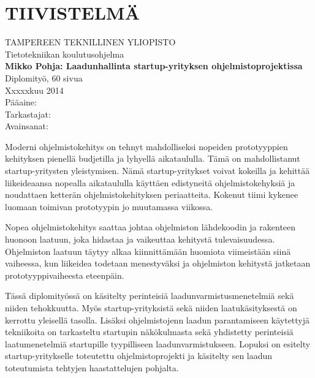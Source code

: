 \newpage
 
\setcounter{page}{1} %
 
\chapter*{TIIVISTELMÄ}
\begin{spacing}{1.0}
\textsf{TAMPEREEN TEKNILLINEN YLIOPISTO}\\
\textsf{Tietotekniikan koulutusohjelma}\\
{\bf \textsf{Mikko Pohja: Laadunhallinta startup-yrityksen ohjelmistoprojektissa}}\\
\textsf{Diplomityö, 60 sivua}\\
\textsf{Xxxxxkuu 2014}\\
\textsf{Pääaine: }\\
\textsf{Tarkastajat: }\\
\textsf{Avainsanat: }\\
\end{spacing}
 
\noindent
Moderni ohjelmistokehitys on tehnyt mahdolliseksi nopeiden prototyyppien kehityksen pienellä budjetilla ja lyhyellä aikataululla. Tämä on mahdollistanut startup-yritysten yleistymisen. Nämä startup-yritykset voivat kokeilla ja kehittää liikeideaansa nopealla aikataululla käyttäen edistyneitä ohjelmistokehyksiä ja noudattaen ketterän ohjelmistokehityksen periaatteita. Kokenut tiimi kykenee luomaan toimivan prototyypin jo muutamassa viikossa.
 
\noindent
Nopea ohjelmistokehitys saattaa johtaa ohjelmiston lähdekoodin ja rakenteen huonoon laatuun, joka hidastaa ja vaikeuttaa kehitystä tulevaisuudessa. Ohjelmiston laatuun täytyy alkaa kiinnittämään huomiota viimeistään siinä vaiheessa, kun liikeidea todetaan menestyväksi ja ohjelmiston kehitystä jatketaan prototyyppivaiheesta eteenpäin. 

\noindent
Tässä diplomityössä on käsitelty perinteisiä laadunvarmistusmenetelmiä sekä niiden tehokkuutta. Myös startup-yrityksistä sekä niiden laatukäsityksestä on kerrottu yleisellä tasolla. Lisäksi ohjelmistojenn laadun parantamiseen käytettyjä tekniikoita on tarkasteltu startupin näkökulmasta sekä yhdistetty perinteisiä laatumenetelmiä startupille tyypilliseen laadunvarmistukseen. Lopuksi on esitelty startup-yritykselle toteutettu ohjelmistoprojekti ja käsitelty sen laadun toteutumista tehtyjen haastattelujen pohjalta.

